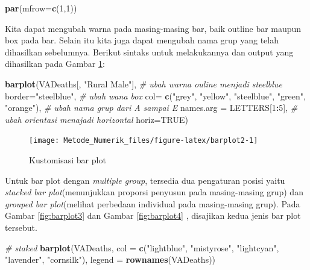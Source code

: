 \documentclass[]{book}
\newenvironment{Shaded}{\begin{snugshade}}{\end{snugshade}}
\newcommand{\CommentTok}[1]{\textcolor[rgb]{0.56,0.35,0.01}{\textit{#1}}}
\newcommand{\DataTypeTok}[1]{\textcolor[rgb]{0.13,0.29,0.53}{#1}}
\newcommand{\DecValTok}[1]{\textcolor[rgb]{0.00,0.00,0.81}{#1}}
\newcommand{\KeywordTok}[1]{\textcolor[rgb]{0.13,0.29,0.53}{\textbf{#1}}}
\newcommand{\NormalTok}[1]{#1}
\newcommand{\OperatorTok}[1]{\textcolor[rgb]{0.81,0.36,0.00}{\textbf{#1}}}
\newcommand{\OtherTok}[1]{\textcolor[rgb]{0.56,0.35,0.01}{#1}}
\newcommand{\StringTok}[1]{\textcolor[rgb]{0.31,0.60,0.02}{#1}}
\theoremstyle{definition}
\theoremstyle{definition}
\theoremstyle{definition}
\theoremstyle{remark}
\begin{document}
\begin{Shaded}
\begin{Highlighting}[]
\KeywordTok{par}\NormalTok{(}\DataTypeTok{mfrow=}\KeywordTok{c}\NormalTok{(}\DecValTok{1}\NormalTok{,}\DecValTok{1}\NormalTok{))}
\end{Highlighting}
\end{Shaded}

Kita dapat mengubah warna pada masing-masing bar, baik outline bar maupun box pada bar. Selain itu kita juga dapat mengubah nama grup yang telah dihasilkan sebelumnya. Berikut sintaks untuk melakukannya dan output yang dihasilkan pada Gambar \ref{fig:barplot2}:

\begin{Shaded}
\begin{Highlighting}[]
\KeywordTok{barplot}\NormalTok{(VADeaths[, }\StringTok{"Rural Male"}\NormalTok{],}
        \CommentTok{# ubah warna ouline menjadi steelblue}
        \DataTypeTok{border=}\StringTok{"steelblue"}\NormalTok{,}
        \CommentTok{# ubah wana box}
        \DataTypeTok{col=} \KeywordTok{c}\NormalTok{(}\StringTok{"grey"}\NormalTok{, }\StringTok{"yellow"}\NormalTok{, }\StringTok{"steelblue"}\NormalTok{, }\StringTok{"green"}\NormalTok{, }\StringTok{"orange"}\NormalTok{),}
        \CommentTok{# ubah nama grup dari A sampai E}
        \DataTypeTok{names.arg =}\NormalTok{ LETTERS[}\DecValTok{1}\OperatorTok{:}\DecValTok{5}\NormalTok{],}
        \CommentTok{# ubah orientasi menajadi horizontal}
        \DataTypeTok{horiz=}\OtherTok{TRUE}\NormalTok{)}
\end{Highlighting}
\end{Shaded}

\begin{figure}

{\centering \texttt{[image: Metode\_Numerik\_files/figure-latex/barplot2-1]} 

}

\caption{Kustomisasi bar plot}\label{fig:barplot2}
\end{figure}

Untuk bar plot dengan \emph{multiple group}, tersedia dua pengaturan posisi yaitu \emph{stacked bar plot}(menunjukkan proporsi penyusun pada masing-masing grup) dan \emph{grouped bar plot}(melihat perbedaan individual pada masing-masing grup). Pada Gambar \ref{fig:barplot3} dan Gambar \ref{fig:barplot4} , disajikan kedua jenis bar plot tersebut.

\begin{Shaded}
\begin{Highlighting}[]
\CommentTok{# staked}
\KeywordTok{barplot}\NormalTok{(VADeaths,}
         \DataTypeTok{col =} \KeywordTok{c}\NormalTok{(}\StringTok{"lightblue"}\NormalTok{, }\StringTok{"mistyrose"}\NormalTok{, }\StringTok{"lightcyan"}\NormalTok{, }
                 \StringTok{"lavender"}\NormalTok{, }\StringTok{"cornsilk"}\NormalTok{),}
        \DataTypeTok{legend =} \KeywordTok{rownames}\NormalTok{(VADeaths))}
\end{Highlighting}
\end{Shaded}
\end{document}
